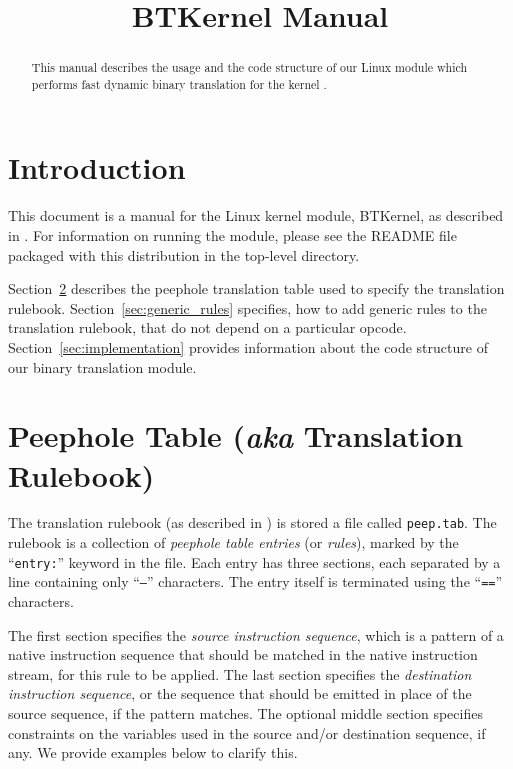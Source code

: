 \documentclass[9pt]{article}
\begin{document}
\title{{\sc BTKernel} Manual}
\author{}

\maketitle

\begin{abstract}
This manual describes the usage and the code structure of our
Linux module which performs fast dynamic binary translation for the
kernel \cite{sosp13}.
\end{abstract}

\section{Introduction}
\label{sec:intro}
This document is a manual for the Linux kernel module, {\sc BTKernel}, as
described in \cite{sosp13}.
For information on running the module, please see the README file packaged
with this distribution in the top-level directory.

Section~\ref{sec:peeptab} describes the peephole translation table
used to specify the translation rulebook. Section~\ref{sec:generic_rules}
specifies, how to add generic rules to the translation rulebook, that do
not depend on a particular opcode. Section~\ref{sec:implementation} provides
information about the code structure of our binary translation
module.

\section{Peephole Table ({\em aka} Translation Rulebook)}
\label{sec:peeptab}
The translation rulebook (as described in \cite{sosp13}) is stored a
file called {\tt peep.tab}. The rulebook is a collection of {\em peephole table
entries} (or {\em rules}), marked by the ``{\tt entry:}'' keyword in the file. Each entry
has three sections, each separated by a line containing only ``{\tt --}''
characters. The entry itself is terminated using the ``{\tt ==}'' characters.

The first section specifies the {\em source
instruction sequence}, which is a pattern of a native instruction sequence that
should be matched in the native instruction stream, for this rule to be applied.
The last section specifies the {\em destination instruction sequence}, or
the sequence that should be emitted in place of the source sequence, if the
pattern matches. The optional middle section specifies constraints on the
variables used in the source and/or destination sequence, if any. We provide
examples below to clarify this.
\end{document}
